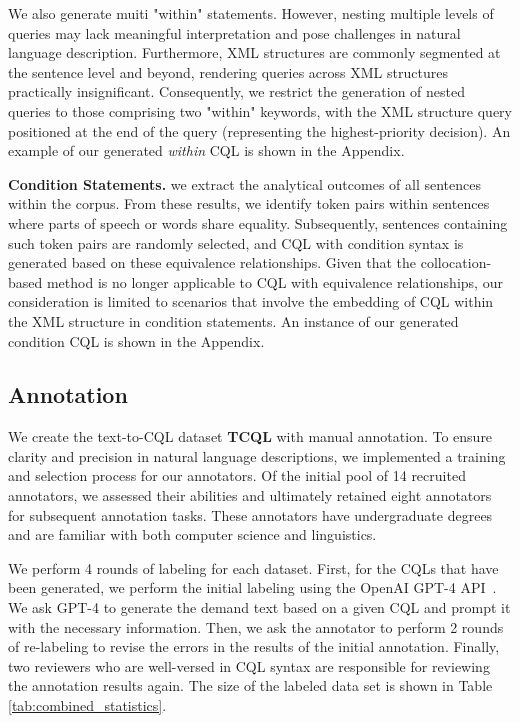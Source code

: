\documentclass[11pt]{article}
\begin{document}
\begin{CJK*}{UTF8}{gbsn}
We also generate muiti "within" statements. However, nesting multiple levels of queries may lack meaningful interpretation and pose challenges in natural language description. Furthermore, XML structures are commonly segmented at the sentence level and beyond, rendering queries across XML structures practically insignificant. Consequently, we restrict the generation of nested queries to those comprising two "within" keywords, with the XML structure query positioned at the end of the query (representing the highest-priority decision). An example of our generated \emph{within} CQL is shown in the Appendix. 


\textbf{Condition Statements. }
we extract the analytical outcomes of all sentences within the corpus. From these results, we identify token pairs within sentences where parts of speech or words share equality. Subsequently, sentences containing such token pairs are randomly selected, and CQL with condition syntax is generated based on these equivalence relationships. Given that the collocation-based method is no longer applicable to CQL with equivalence relationships, our consideration is limited to scenarios that involve the embedding of CQL within the XML structure in condition statements. An instance of our generated condition CQL is shown in the Appendix.


\subsection{Annotation}

We create the text-to-CQL dataset \textbf{TCQL} with manual annotation. To ensure clarity and precision in natural language descriptions, we implemented a training and selection process for our annotators. Of the initial pool of 14 recruited annotators, we assessed their abilities and ultimately retained eight annotators for subsequent annotation tasks. These annotators have undergraduate degrees and are familiar with both computer science and linguistics.

We perform 4 rounds of labeling for each dataset. First, for the CQLs that have been generated, we perform the initial labeling using the OpenAI GPT-4 API~\citep{openai2023gpt4}. We ask GPT-4 to generate the demand text based on a given CQL and prompt it with the necessary information. Then, we ask the annotator to perform 2 rounds of re-labeling to revise the errors in the results of the initial annotation. Finally, two reviewers who are well-versed in CQL syntax are responsible for reviewing the annotation results again. The size of the labeled data set is shown in Table \ref{tab:combined_statistics}.


\end{CJK*}
\end{document}
